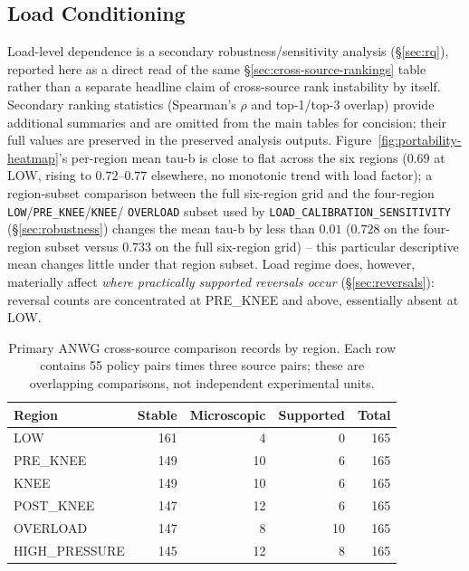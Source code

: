 \subsection{Load Conditioning}
\label{sec:load-conditioning}

Load-level dependence is a secondary robustness/sensitivity analysis
(\S\ref{sec:rq}), reported here as a direct read of the same
\S\ref{sec:cross-source-rankings} table rather than a separate headline
claim of cross-source rank instability by itself. Secondary ranking statistics (Spearman's $\rho$ and top-1/top-3 overlap) provide additional summaries and are omitted from the main tables for concision; their full values are preserved in the preserved analysis outputs. Figure~\ref{fig:portability-heatmap}'s
per-region mean tau-b is close to flat across the six regions ($0.69$ at
LOW, rising to $0.72$--$0.77$ elsewhere, no monotonic trend with load
factor); a region-subset comparison between the full six-region
grid and the four-region \texttt{LOW}/\texttt{PRE\_KNEE}/\texttt{KNEE}/
\texttt{OVERLOAD} subset used by \texttt{LOAD\_CALIBRATION\_SENSITIVITY}
(\S\ref{sec:robustness}) changes the mean tau-b by less than $0.01$
($0.728$ on the four-region subset versus $0.733$ on the full six-region
grid) -- this particular descriptive mean changes little under that region subset. Load
regime does, however, materially affect \emph{where practically supported
reversals occur} (\S\ref{sec:reversals}): reversal counts are concentrated
at PRE\_KNEE and above, essentially absent at LOW.

\begin{table}[t]\centering
\caption{Primary ANWG cross-source comparison records by region. Each row
contains 55 policy pairs times three source pairs; these are overlapping
comparisons, not independent experimental units.}\label{tab:region-counts}
\begin{tabular}{lrrrr}\toprule
Region & Stable & Microscopic & Supported & Total\\\midrule
LOW & 161 & 4 & 0 & 165\\
PRE\_KNEE & 149 & 10 & 6 & 165\\
KNEE & 149 & 10 & 6 & 165\\
POST\_KNEE & 147 & 12 & 6 & 165\\
OVERLOAD & 147 & 8 & 10 & 165\\
HIGH\_PRESSURE & 145 & 12 & 8 & 165\\\bottomrule
\end{tabular}
\end{table}

